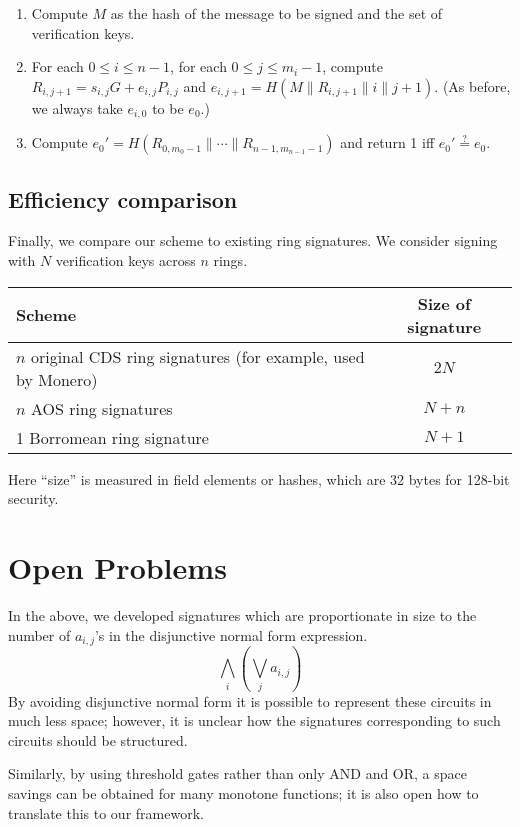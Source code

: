 \documentclass[letterpaper]{article}
\begin{document}
\begin{enumerate}
\item Compute $M$ as the hash of the message to be signed and the set of
verification keys.
\item For each $0\leq i\leq n -1$,
      for each $0\leq j\leq m_i - 1$, compute $R_{i,j+1} = s_{i,j}G + e_{i,j}P_{i,j}$
and $e_{i,j+1} = H(M\|R_{i,j+1}\|i\|j+1)$. (As before, we always take $e_{i,0}$ to be $e_0$.)
\item Compute $e_0' = H(R_{0,m_0-1} \|\cdots \| R_{n-1,m_{n-1}-1})$ and return 1 iff $e_0'\stackrel{?}{=} e_0$.
\end{enumerate}

\subsection{Efficiency comparison}

Finally, we compare our scheme to existing ring signatures. We consider signing
with $N$ verification keys across $n$ rings.

\begin{center}
\begin{tabular}{|l|c|}
\hline
\textbf{Scheme} & \textbf{Size of signature}	\\
\hline
\parbox[t]{6cm}{$n$ original CDS ring signatures\cite{cramer+damgard+schoenmakers1994}\\
(for example, used by Monero)} & $2N$	\\
\hline
$n$ AOS ring signatures & $N + n$	\\
 Borromean ring signature & $N + 1$	\\
\hline
\end{tabular}
\end{center}
Here ``size'' is measured in field elements or hashes, which are 32 bytes for
128-bit security.

\section{Open Problems}

In the above, we developed signatures which are proportionate in size to the
number of $a_{i,j}$'s in the disjunctive normal form expression.
\[ \bigwedge_i \left(\bigvee_j a_{i,j}\right) \]
By avoiding disjunctive normal form it is possible to represent these circuits
in much less space; however, it is unclear how the signatures corresponding
to such circuits should be structured.

Similarly, by using threshold gates rather than only AND and OR, a space
savings can be obtained for many monotone functions; it is also open how to
translate this to our framework.


\nolinenumbers
\clearpage


\end{document}
